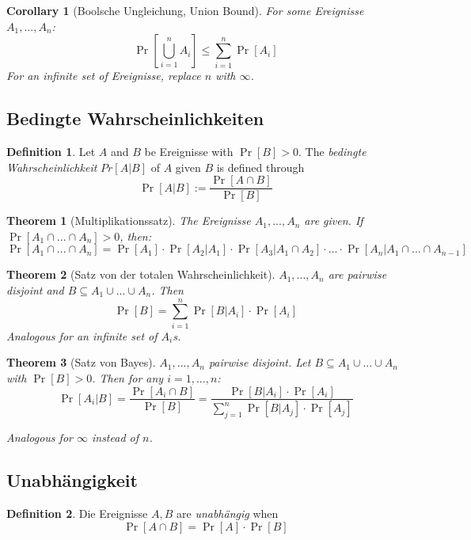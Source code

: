 \documentclass[12pt]{extarticle}
\theoremstyle{definition}
\newtheorem{definition}{Definition}
\theoremstyle{remark}
\theoremstyle{plain}
\newtheorem{theorem}{Theorem}
\theoremstyle{plain}
\theoremstyle{plain}
\newtheorem{corollary}{Corollary}
\begin{document}
\begin{corollary}[Boolsche Ungleichung, Union Bound]
    For some Ereignisse $A_1, ..., A_n$:
    \[ \Pr \left[ \bigcup_{i=1}^n A_i \right] \le \sum_{i=1}^n \Pr[A_i]\]
    For an infinite set of Ereignisse, replace $n$ with $\infty$.
\end{corollary}

\subsection{Bedingte Wahrscheinlichkeiten}

\begin{definition}
    Let $A$ and $B$ be Ereignisse with $\Pr[B] > 0$.
    The \textit{bedingte Wahrscheinlichkeit} $Pr[A|B]$ of $A$ given $B$
    is defined through
    \[ \Pr[A|B] := \frac{\Pr[A \cap B]}{\Pr[B]} \]
\end{definition}

\begin{theorem}[Multiplikationssatz]
    The Ereignisse $A_1, ..., A_n$ are given.
    If $\Pr[A_1 \cap ... \cap A_n] > 0$, then:
    \[ \Pr[A_1 \cap ... \cap A_n] = \Pr[A_1] \cdot \Pr[A_2 | A_1] \cdot \Pr[A_3 | A_1 \cap A_2] \cdot ... \cdot \Pr[A_n | A_1 \cap ... \cap A_{n-1}] \]
\end{theorem}

\begin{theorem}[Satz von der totalen Wahrscheinlichkeit]
    $A_1, ..., A_n$ are pairwise disjoint and $B \subseteq A_1 \cup ... \cup A_n$.
    Then
    \[ \Pr[B] = \sum_{i=1}^n \Pr[B|A_i] \cdot \Pr[A_i] \]
    Analogous for an infinite set of $A_i$s.
\end{theorem}

\begin{theorem}[Satz von Bayes]
    $A_1, ..., A_n$ pairwise disjoint.
    Let $B \subseteq A_1 \cup ... \cup A_n$ with $\Pr[B] > 0$.
    Then for any $i = 1,...,n$:
    \[ \Pr[A_i | B] = \frac{\Pr[A_i \cap B]}{\Pr[B]} = \frac{\Pr[B|A_i] \cdot \Pr[A_i]}{\sum_{j=1}^n \Pr[B|A_j] \cdot \Pr[A_j]} \]

    Analogous for $\infty$ instead of $n$.
\end{theorem}

\subsection{Unabhängigkeit}

\begin{definition}
    Die Ereignisse $A, B$ are \textit{unabhängig} when
    \[ \Pr[A \cap B] = \Pr[A] \cdot \Pr[B] \]
\end{definition}
\end{document}

